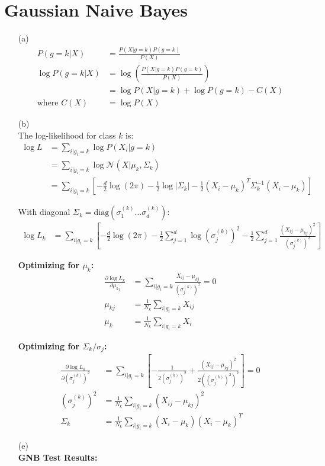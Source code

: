 \documentclass[12pt]{article}
\begin{document}
\section*{Gaussian Naive Bayes}
\label{sec:gnb}
\begin{enumerate}
        \item[(a)]
\begin{align*}
P(g = k|X) &= \frac{P(X|g = k)P(g = k)}{P(X)}\\
\log P(g = k|X) &= \log\left(\frac{P(X|g = k)P(g = k)}{P(X)}\right)\\
&= \log P(X|g = k) + \log P(g = k) - C(X)\\
\text{where }C(X) &= \log P(X)
\end{align*}
       \item[(b)]\\
       The log-likelihood for class $k$ is:
       \begin{align*}
       \log L &= \sum_{i|g_i=k} \log P(X_i|g = k)\\
       &= \sum_{i|g_i=k} \log \mathcal{N}(X| \mu_k, \Sigma_k)\\
       &= \sum_{i|g_i=k} \left[-\frac{d}{2}\log(2\pi) - \frac{1}{2}\log|\Sigma_k| - \frac{1}{2}(X_i - \mu_k)^T\Sigma_k^{-1}(X_i - \mu_k)\right]
       \end{align*}
       
       With diagonal $\Sigma_k = \text{diag}(\sigma_1^{(k)} \ldots \sigma_d^{(k)})$:
       \begin{align*}
       \log L_k &= \sum_{i|g_i=k} \left[-\frac{d}{2}\log(2\pi) - \frac{1}{2}\sum_{j=1}^d \log(\sigma_j^{(k)})^2 - \frac{1}{2}\sum_{j=1}^d \frac{(X_{ij} - \mu_{kj})^2}{(\sigma_j^{(k)})^2}\right]
       \end{align*}
       
       \textbf{Optimizing for $\mu_k$:}
       \begin{align*}
       \frac{\partial \log L_k}{\partial \mu_{kj}} &= \sum_{i|g_i=k} \frac{X_{ij} - \mu_{kj}}{(\sigma_j^{(k)})^2} = 0\\
       \mu_{kj} &= \frac{1}{N_k}\sum_{i|g_i=k} X_{ij}\\
       \mu_k &= \frac{1}{N_k}\sum_{i|g_i=k} X_i
       \end{align*}
       
       \textbf{Optimizing for $\Sigma_k/\sigma_j$:}
       \begin{align*}
       \frac{\partial \log L_k}{\partial (\sigma_j^{(k)})^2} &= \sum_{i|g_i=k} \left[-\frac{1}{2(\sigma_j^{(k)})^2} + \frac{(X_{ij} - \mu_{kj})^2}{2((\sigma_j^{(k)})^2)^2}\right] = 0\\
       (\sigma_j^{(k)})^2 &= \frac{1}{N_k}\sum_{i|g_i=k} (X_{ij} - \mu_{kj})^2\\
       \Sigma_k &= \frac{1}{N_k}\sum_{i|g_i=k} (X_i - \mu_k)(X_i - \mu_k)^T
       \end{align*}
        \item[(e)]\\
        \textbf{GNB Test Results:}


\end{enumerate}
\end{document}
